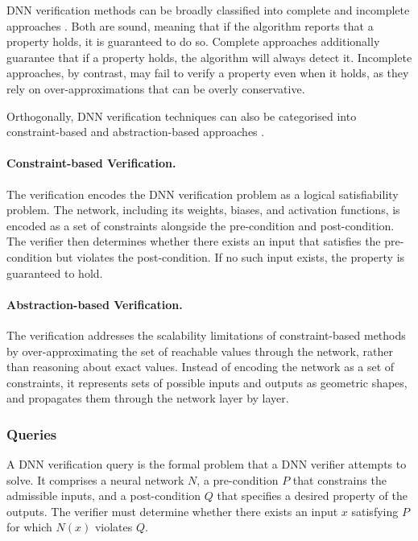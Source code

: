DNN verification methods can be broadly classified into complete and incomplete approaches \cite{algorithms_for_verifying_dnns}. Both are sound, meaning that if the algorithm reports that a property holds, it is guaranteed to do so. Complete approaches additionally guarantee that if a property holds, the algorithm will always detect it. Incomplete approaches, by contrast, may fail to verify a property even when it holds, as they rely on over-approximations that can be overly conservative.

Orthogonally, DNN verification techniques can also be categorised into
constraint-based and abstraction-based approaches \cite{introduction_to_nn_verification}.

\paragraph*{Constraint-based Verification.} The verification encodes
the DNN verification problem as a logical satisfiability problem. The network,
including its weights, biases, and activation functions, is encoded as a set of
constraints alongside the pre-condition and post-condition. The verifier then
determines whether there exists an input that satisfies the pre-condition but
violates the post-condition. If no such input exists, the property is guaranteed
to hold.

\paragraph*{Abstraction-based Verification.} The verification addresses
the scalability limitations of constraint-based methods by over-approximating the
set of reachable values through the network, rather than reasoning about exact
values. Instead of encoding the network as a set of constraints, it represents
sets of possible inputs and outputs as geometric shapes, and propagates them
through the network layer by layer.

\subsubsection{Queries} \label{sec:queries}

A DNN verification query is the formal problem that a DNN verifier attempts to solve. It comprises a neural network $N$, a pre-condition $P$ that constrains the admissible inputs, and a post-condition $Q$ that specifies a desired property of the outputs. The verifier must determine whether there exists an input $x$ satisfying $P$ for which $N(x)$ violates $Q$.

